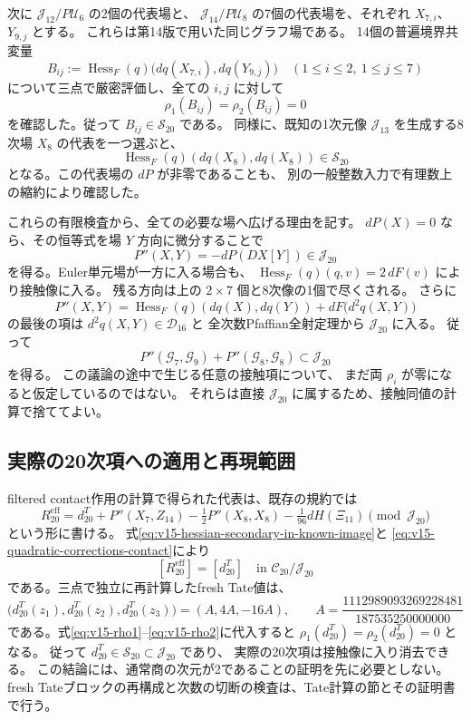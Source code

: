 次に $\mathcal J_{12}/P\mathcal U_6$ の2個の代表場と、
$\mathcal J_{14}/P\mathcal U_8$ の7個の代表場を、それぞれ
$X_{7,i}$、$Y_{9,j}$ とする。
これらは第14版で用いた同じグラフ場である。
14個の普遍境界共変量
\[
 B_{ij}:=\operatorname{Hess}_F(q)
          \bigl(dq(X_{7,i}),dq(Y_{9,j})\bigr)
 \quad (1\le i\le2,\ 1\le j\le7)
\]
について三点で厳密評価し、全ての $i,j$ に対して
\[
 \rho_1(B_{ij})=\rho_2(B_{ij})=0
\]
を確認した。従って $B_{ij}\in\mathcal S_{20}$ である。
同様に、既知の1次元像 $\mathcal J_{13}$ を生成する8次場 $X_8$ の代表を一つ選ぶと、
\[
 \operatorname{Hess}_F(q)(dq(X_8),dq(X_8))\in\mathcal S_{20}
\]
となる。この代表場の $dP$ が非零であることも、
別の一般整数入力で有理数上の縮約により確認した。

これらの有限検査から、全ての必要な場へ広げる理由を記す。
$dP(X)=0$ なら、その恒等式を場 $Y$ 方向に微分することで
\[
 P''(X,Y)=-dP(DX[Y])\in\mathcal J_{20}
\]
を得る。Euler単元場が一方に入る場合も、
$\operatorname{Hess}_F(q)(q,v)=2\,dF(v)$ により接触像に入る。
残る方向は上の $2\times7$ 個と8次像の1個で尽くされる。
さらに
\[
 P''(X,Y)=\operatorname{Hess}_F(q)(dq(X),dq(Y))
            +dF\bigl(d^2q(X,Y)\bigr)
\]
の最後の項は $d^2q(X,Y)\in\mathcal D_{16}$ と
全次数Pfaffian全射定理から $\mathcal J_{20}$ に入る。
従って
\begin{equation}\label{eq:v15-quadratic-corrections-contact}
 P''(\mathcal G_7,\mathcal G_9)
  +P''(\mathcal G_8,\mathcal G_8)\subset\mathcal J_{20}
\end{equation}
を得る。
この議論の途中で生じる任意の接触項について、
まだ両 $\rho_i$ が零になると仮定しているのではない。
それらは直接 $\mathcal J_{20}$ に属するため、接触同値の計算で捨ててよい。

\subsection{実際の20次項への適用と再現範囲}

filtered contact作用の計算で得られた代表は、既存の規約では
\[
 R_{20}^{\mathrm{eff}}
 =d_{20}^{T}+P''(X_7,Z_{14})
       -\tfrac12P''(X_8,X_8)-\tfrac1{96}dH(\Xi_{11})
       \pmod{\mathcal J_{20}}
\]
という形に書ける。
式\eqref{eq:v15-hessian-secondary-in-known-image}と
\eqref{eq:v15-quadratic-corrections-contact}により
\[
 [R_{20}^{\mathrm{eff}}]=[d_{20}^{T}]
 \quad\text{in }\mathcal C_{20}/\mathcal J_{20}
\]
である。三点で独立に再計算したfresh Tate値は、
\[
 \bigl(d_{20}^{T}(z_1),d_{20}^{T}(z_2),d_{20}^{T}(z_3)\bigr)
 =(A,4A,-16A),\qquad
 A=\frac{1112989093269228481}{187535250000000}
\]
である。式\eqref{eq:v15-rho1}--\eqref{eq:v15-rho2}に代入すると
$\rho_1(d_{20}^{T})=\rho_2(d_{20}^{T})=0$ となる。
従って $d_{20}^{T}\in\mathcal S_{20}\subset\mathcal J_{20}$ であり、
実際の20次項は接触像に入り消去できる。
この結論には、通常商の次元が2であることの証明を先に必要としない。
fresh Tateブロックの再構成と次数の切断の検査は、Tate計算の節とその証明書で行う。

